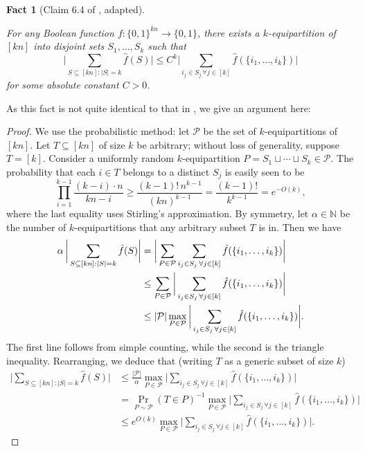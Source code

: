 \documentclass[10pt,a4paper]{article}
\newtheorem{fact}[theorem]{Fact}
\theoremstyle{definition}
\begin{document}
\begin{fact}[Claim 6.4 of \cite{xorlemma}, adapted]
\label{fact:f3}

For any Boolean function $f:\{0,1\}^{kn}\to \{0,1\}$, there exists a $k$-equipartition of $[kn]$ into disjoint sets $S_1,\ldots,S_k$ such that
\begin{equation*}
    \biggl| \sum_{S\subseteq [kn]:\vert S\vert=k} \hat{f}(S) \biggr|
    \leq C^k \biggl| \sum_{i_j\in S_j\, \forall j\in [k]} \hat{f}(\{i_1,\ldots,i_k\}) \biggr|
\end{equation*}
for some absolute constant $C>0$.
\end{fact}
As this fact is not quite identical to that in \cite{xorlemma}, we give an argument here:
\begin{proof}
We use the probabilistic method: let $\mathcal{P}$ be the set of $k$-equipartitions of $[kn]$. Let $T\subseteq [kn]$ of size $k$ be arbitrary; without loss of generality, suppose $T=[k]$. Consider a uniformly random $k$-equipartition $P=S_1\sqcup \cdots \sqcup S_k\in \mathcal{P}$. The probability that each $i\in T$ belongs to a distinct $S_j$ is easily seen to be
\begin{equation*}
    \prod_{i=1}^{k-1} \frac{(k-i)\cdot n}{kn-i}\geq \frac{(k-1)!\, n^{k-1}}{(kn)^{k-1}}=\frac{(k-1)!}{k^{k-1}}=e^{-O(k)},
\end{equation*}
where the last equality uses Stirling's approximation.  By symmetry, let $\alpha\in \mathbb{N}$ be the number of $k$-equipartitions that any arbitrary subset $T$ is in. Then we have
\begin{align*}
    \alpha \, \bigg\vert \sum_{S\subseteq [kn]:\vert S\vert=k} \hat{f}(S)\bigg\vert &= \bigg\vert \sum_{P\in \mathcal{P}} \sum_{i_j\in S_j\, \forall j\in [k]} \hat{f}(\{i_1,\ldots,i_k\})\bigg\vert\\
    &\leq \sum_{P\in \mathcal{P}}\bigg\vert \sum_{i_j\in S_j\, \forall j\in [k]} \hat{f}(\{i_1,\ldots,i_k\})\bigg\vert\\
    &\leq \vert \mathcal{P}\vert \max_{P\in \mathcal{P}} \bigg\vert \sum_{i_j\in S_j\, \forall j\in [k]} \hat{f}(\{i_1,\ldots,i_k\})\bigg\vert. \qedhere
\end{align*}
The first line follows from simple counting, while the second is the triangle inequality. Rearranging, we deduce that (writing $T$ as a generic subset of size $k$)
\begin{align*}
    \bigg\vert \sum_{S\subseteq [kn]:\vert S\vert=k} \hat{f}(S)\bigg\vert&\leq \frac{\vert \mathcal{P}\vert}{\alpha} \max_{P\in \mathcal{P}} \bigg\vert \sum_{i_j\in S_j\, \forall j\in [k]} \hat{f}(\{i_1,\ldots,i_k\})\bigg\vert\\
    &= \Pr_{P\sim \mathcal{P}}(T\in P)^{-1} \max_{P\in \mathcal{P}} \bigg\vert \sum_{i_j\in S_j\, \forall j\in [k]} \hat{f}(\{i_1,\ldots,i_k\})\bigg\vert\\
    &\leq e^{O(k)} \max_{P\in \mathcal{P}} \bigg\vert \sum_{i_j\in S_j\, \forall j\in [k]} \hat{f}(\{i_1,\ldots,i_k\})\bigg\vert.
\end{align*}
\end{proof}
\end{document}
